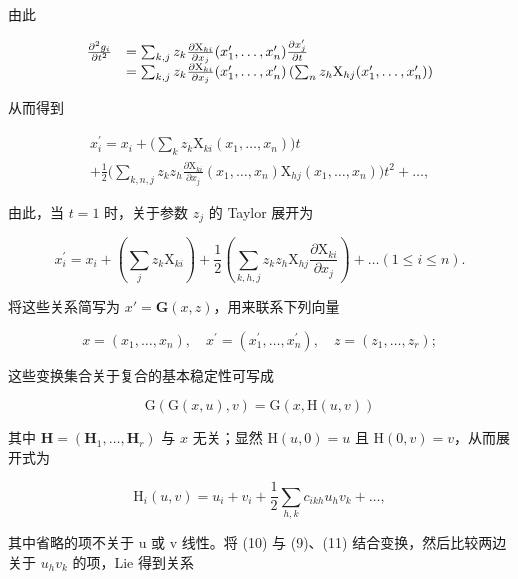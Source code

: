 由此

\[
\begin{array}{r l} \frac {\partial^ {2} g _ {i}}{\partial t ^ {2}} & = \sum_ {k, j} z _ {k} \frac {\partial \mathrm{X} _ {k i}}{\partial x _ {j}} (x _ {1} ^ {\prime}, \ldots , x _ {n} ^ {\prime}) \frac {\partial x _ {j} ^ {\prime}}{\partial t} \\ & = \sum_ {k, j} z _ {k} \frac {\partial \mathrm{X} _ {k i}}{\partial x _ {j}} (x _ {1} ^ {\prime}, \ldots , x _ {n} ^ {\prime}) \left(\sum_ {n} z _ {h} \mathrm{X} _ {h j} (x _ {1} ^ {\prime}, \ldots , x _ {n} ^ {\prime})\right) \end{array}
\]

从而得到

\[
\begin{array}{r} x _ {i} ^ {\prime} = x _ {i} + \Big (\sum_ {k} z _ {k} \mathrm{X} _ {k i} (x _ {1}, \ldots , x _ {n}) \Big) t \\ + \frac {1}{2} \Big (\sum_ {k, n, j} z _ {k} z _ {h} \frac {\partial \mathrm{X} _ {k i}}{\partial x _ {j}} (x _ {1}, \ldots , x _ {n}) \mathrm{X} _ {h j} (x _ {1}, \ldots , x _ {n}) \Big) t ^ {2} + \dots , \end{array}
\]

由此，当 \(t = 1\) 时，关于参数 \(z_{j}\) 的 Taylor 展开为

\[
x _ {i} ^ {\prime} = x _ {i} + \left(\sum_ {j} z _ {k} \mathrm{X} _ {k i}\right) + \frac {1}{2} \left(\sum_ {k, h, j} z _ {k} z _ {h} \mathrm{X} _ {h j} \frac {\partial \mathrm{X} _ {k i}}{\partial x _ {j}}\right) + \dots (1 \leqslant i \leqslant n).\tag{9}
\]

将这些关系简写为 \(x' = \mathbf{G}(x, z)\)，用来联系下列向量

\[
x = (x _ {1}, \dots , x _ {n}), \quad x ^ {\prime} = (x _ {1} ^ {\prime}, \dots , x _ {n} ^ {\prime}), \quad z = (z _ {1}, \dots , z _ {r});
\]

这些变换集合关于复合的基本稳定性可写成

\[
\mathrm{G} (\mathrm{G} (x, u), v) = \mathrm{G} (x, \mathrm{H} (u, v))\tag{10}
\]

其中 \(\mathbf{H} = (\mathbf{H}_1, \ldots, \mathbf{H}_r)\) 与 \(x\) 无关；显然 \(\mathrm{H}(u, 0) = u\) 且 \(\mathrm{H}(0, v) = v\)，从而展开式为

\[
\mathrm{H} _ {i} (u, v) = u _ {i} + v _ {i} + \frac {1}{2} \sum_ {h, k} c _ {i k h} u _ {h} v _ {k} + \dots ,\tag{11}
\]

其中省略的项不关于 u 或 v 线性。将 (10) 与 (9)、(11) 结合变换，然后比较两边关于 \(u_{h}v_{k}\) 的项，Lie 得到关系

